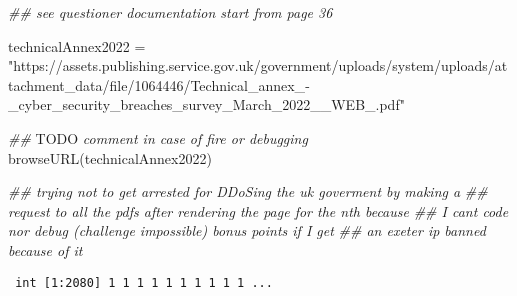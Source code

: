 \documentclass[
  a4paper,
  DIV=11,
  numbers=noendperiod]{scrartcl}
\newenvironment{Shaded}{\begin{snugshade}}{\end{snugshade}}
\newcommand{\AlertTok}[1]{\textcolor[rgb]{0.68,0.00,0.00}{#1}}
\newcommand{\AttributeTok}[1]{\textcolor[rgb]{0.40,0.45,0.13}{#1}}
\newcommand{\DocumentationTok}[1]{\textcolor[rgb]{0.37,0.37,0.37}{\textit{#1}}}
\newcommand{\FunctionTok}[1]{\textcolor[rgb]{0.28,0.35,0.67}{#1}}
\newcommand{\NormalTok}[1]{\textcolor[rgb]{0.00,0.23,0.31}{#1}}
\newcommand{\OtherTok}[1]{\textcolor[rgb]{0.00,0.23,0.31}{#1}}
\newcommand{\SpecialCharTok}[1]{\textcolor[rgb]{0.37,0.37,0.37}{#1}}
\newcommand{\StringTok}[1]{\textcolor[rgb]{0.13,0.47,0.30}{#1}}
\begin{document}
\begin{Shaded}
\begin{Highlighting}[]
\DocumentationTok{\#\# see questioner documentation start from page 36}

\NormalTok{technicalAnnex2022 }\OtherTok{=} \StringTok{"https://assets.publishing.service.gov.uk/government/uploads/system/uploads/attachment\_data/file/1064446/Technical\_annex\_{-}\_cyber\_security\_breaches\_survey\_March\_2022\_\_WEB\_.pdf"}

\DocumentationTok{\#\# }\AlertTok{TODO}\DocumentationTok{ comment in case of fire or debugging}
\FunctionTok{browseURL}\NormalTok{(technicalAnnex2022)}

\DocumentationTok{\#\# trying not to get arrested for DDoSing the uk goverment by making a}
\DocumentationTok{\#\# request to all the pdfs after rendering the page for the nth because}
\DocumentationTok{\#\# I can\textquotesingle{}t code nor debug (challenge impossible) bonus points if I get}
\DocumentationTok{\#\# an exeter ip banned because of it}
\end{Highlighting}
\end{Shaded}

\begin{Shaded}
\end{Shaded}

\begin{verbatim}
 int [1:2080] 1 1 1 1 1 1 1 1 1 1 ...
\end{verbatim}
\end{document}
